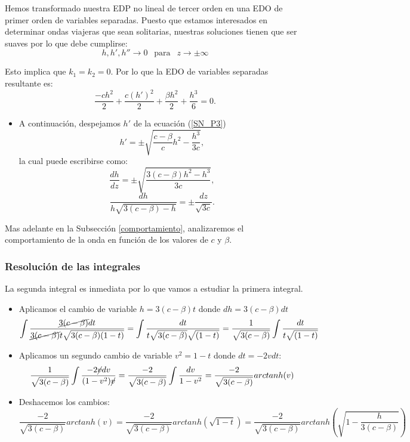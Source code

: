 Hemos transformado nuestra EDP no lineal de tercer orden en una EDO de primer orden de variables separadas.
Puesto que estamos interesados en determinar ondas viajeras que sean solitarias, nuestras soluciones tienen que ser suaves por lo que debe cumplirse:
$$h,h',h'' \rightarrow 0 \ \ \mbox{ para } \ \ z\rightarrow \pm \infty$$

Esto implica que $k_{1}=k_{2}=0$. Por lo que la EDO de variables separadas resultante es:
\begin{equation}
    \frac{-ch^{2}}{2}+\frac{c(h')^{2}}{2}+\frac{\beta h^{2}}{2}+\frac{h^{3}}{6}=0. \label{SN_P3}
\end{equation}
\begin{itemize}
    \item A continuación, despejamos $h'$ de la ecuación (\ref{SN_P3})
    $$h'=\pm \sqrt{\frac{c-\beta}{c}h^{2}-\frac{h^{3}}{3c}},$$
    la cual puede escribirse como:
    $$\frac{dh}{dz}=\pm \sqrt{\frac{3(c-\beta)h^{2}-h^{3}}{3c}},$$
    $$\frac{dh}{h\sqrt{3(c-\beta)-h}}=\pm\frac{dz}{\sqrt{3c}}.$$
\end{itemize}

Mas adelante en la Subsección \ref{comportamiento}, analizaremos el comportamiento de la onda en función de los valores de $c$ y $\beta$.


\subsubsection{Resolución de las integrales}

La segunda integral es inmediata por lo que vamos a estudiar la primera integral.
\begin{itemize}
    \item Aplicamos el cambio de variable $h=3(c-\beta)t$ donde $dh=3(c-\beta)dt$
    $$\int \frac{\cancel{3(c-\beta)}dt}{\cancel{3(c-\beta)}t\sqrt{3(c-\beta)(1-t)}}=\int \frac{dt}{t\sqrt{3(c-\beta)}\sqrt{(1-t)}}=\frac{1}{\sqrt{3(c-\beta)}}\int \frac{dt}{t\sqrt{(1-t)}}$$
    \item Aplicamos un segundo cambio de variable $v^{2}=1-t$ donde $dt=-2vdt$:
    $$\frac{1}{\sqrt{3(c-\beta)}}\int \frac{-2\cancel{v}dv}{(1-v^{2})\cancel{v}}=\frac{-2}{\sqrt{3(c-\beta)}}\int \frac{dv}{1-v^{2}}=\frac{-2}{\sqrt{3(c-\beta)}}arctanh(v)$$
    \item Deshacemos los cambios:
    $$\frac{-2}{\sqrt{3(c-\beta)}}arctanh(v)=\frac{-2}{\sqrt{3(c-\beta)}}arctanh(\sqrt{1-t})=\frac{-2}{\sqrt{3(c-\beta)}}arctanh\left(\sqrt{1-\frac{h}{3(c-\beta)}}\right)$$
\end{itemize}

